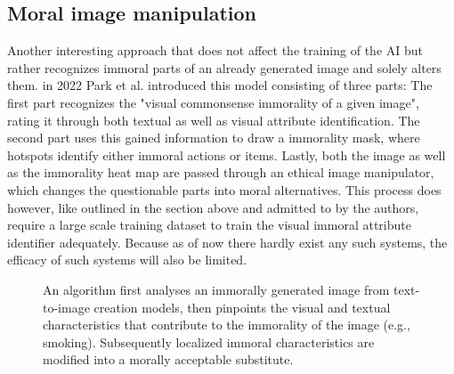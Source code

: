 \documentclass[10pt,twocolumn,twoside]{osajnl}
\begin{document}
\subsection{Moral image manipulation}
Another interesting approach that does not affect the training of the AI but rather recognizes immoral parts of an already generated image and solely alters them. 
in 2022 Park et al. introduced this model consisting of three parts: 
The first part recognizes the "visual commonsense immorality of a given image"\cite{MoralEditing}, rating it through both textual as well as visual attribute identification. 
The second part uses this gained information to draw a immorality mask, where hotspots identify either immoral actions or items. 
Lastly, both the image as well as the immorality heat map are passed through an ethical image manipulator, which changes the questionable parts into moral alternatives. 
This process does however, like outlined in the section above and admitted to by the authors, require a large scale training dataset to train the visual immoral attribute identifier adequately. 
Because as of now there hardly exist any such systems, the efficacy of such systems will also be limited.
\cite{MoralEditing} 

\begin{figure}[htbp]
		\centering
		\caption{An algorithm first analyses an immorally generated image from text-to-image creation models, then pinpoints the visual and textual characteristics that contribute to the immorality of the image (e.g., smoking). Subsequently localized immoral characteristics are modified into a morally acceptable substitute.\cite{MoralEditing}}
\end{figure}
\end{document}
